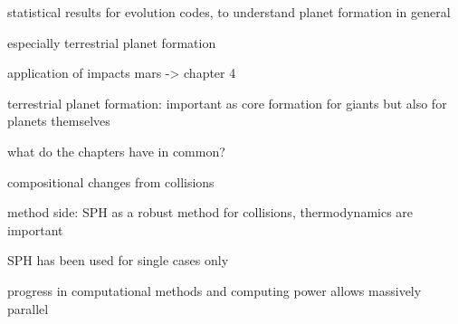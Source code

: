 statistical results for evolution codes, to understand planet formation in general

especially terrestrial planet formation \cite{2006Icar..184...39O} 

application of impacts mars -> chapter 4


\cite{Chambers:2004p4098}

terrestrial planet formation: important as core formation for giants but also for planets themselves


what do the chapters have in common?

compositional changes from collisions

method side: SPH as a robust method for collisions, thermodynamics are important

SPH has been used for single cases only

progress in computational methods and computing power allows massively parallel 









